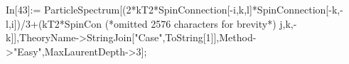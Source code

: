 In[43]:= ParticleSpectrum[(2*kT2*SpinConnection[-i,k,l]*SpinConnection[-k,-l,i])/3+(kT2*SpinCon (*omitted 2576 characters for brevity*) j,k,-k]],TheoryName->StringJoin["Case",ToString[1]],Method->"Easy",MaxLaurentDepth->3];